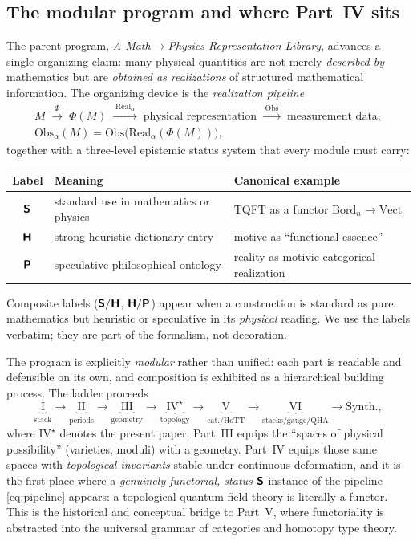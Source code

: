 \documentclass[12pt]{article}
\theoremstyle{definition}
\theoremstyle{remark}
\newcommand{\Bord}{\mathrm{Bord}}
\newcommand{\Vect}{\mathrm{Vect}}
\newcommand{\Real}{\mathrm{Real}}
\newcommand{\Obs}{\mathrm{Obs}}
\newcommand{\Sfont}{\textnormal{\sffamily\bfseries S}}
\newcommand{\Hfont}{\textnormal{\sffamily\bfseries H}}
\newcommand{\Pfont}{\textnormal{\sffamily\bfseries P}}
\begin{document}
\subsection{The modular program and where Part~IV sits}

The parent program, \emph{A Math$\to$Physics Representation Library}, advances a
single organizing claim: many physical quantities are not merely \emph{described
by} mathematics but are \emph{obtained as realizations} of structured
mathematical information. The organizing device is the \emph{realization
pipeline}
\begin{equation}
\label{eq:pipeline}
\begin{gathered}
  M \;\xrightarrow{\;\Phi\;}\; \Phi(M)
    \;\xrightarrow{\;\Real_\alpha\;}\; \text{physical representation}
    \;\xrightarrow{\;\Obs\;}\; \text{measurement data},\\[0.4em]
  \Obs_\alpha(M) = \Obs\bigl(\Real_\alpha(\Phi(M))\bigr),
\end{gathered}
\end{equation}
together with a three-level epistemic status system that every module must carry:
\begin{center}
\small
\begin{tabular}{c l p{5.1cm}}
\toprule
Label & Meaning & Canonical example\\
\midrule
$\Sfont$ & standard use in mathematics or physics & TQFT as a functor $\Bord_n\to\Vect$\\
$\Hfont$ & strong heuristic dictionary entry & motive as ``functional essence''\\
$\Pfont$ & speculative philosophical ontology & reality as motivic-categorical realization\\
\bottomrule
\end{tabular}
\end{center}
Composite labels ($\Sfont/\Hfont$, $\Hfont/\Pfont$) appear when a construction is
standard as pure mathematics but heuristic or speculative in its \emph{physical}
reading. We use the labels verbatim; they are part of the formalism, not
decoration.

The program is explicitly \emph{modular} rather than unified: each part is
readable and defensible on its own, and composition is exhibited as a hierarchical
building process. The ladder proceeds
{\small
\[
  \underbrace{\text{I}}_{\text{stack}}\to
  \underbrace{\text{II}}_{\text{periods}}\to
  \underbrace{\text{III}}_{\text{geometry}}\to
  \underbrace{\text{IV}^{\!\star}}_{\text{topology}}\to
  \underbrace{\text{V}}_{\text{cat./HoTT}}\to
  \underbrace{\text{VI}}_{\text{stacks/gauge/QHA}}\to
  \text{Synth.},
\]}%
where $\text{IV}^{\star}$ denotes the present paper.
Part~III equips the ``spaces of physical possibility'' (varieties, moduli) with a
geometry. Part~IV equips those same spaces with \emph{topological invariants}
stable under continuous deformation, and it is the first place where a
\emph{genuinely functorial, status-$\Sfont$} instance of the pipeline
\eqref{eq:pipeline} appears: a topological quantum field theory is literally a
functor. This is the historical and conceptual bridge to Part~V, where
functoriality is abstracted into the universal grammar of categories and homotopy
type theory.
\end{document}
